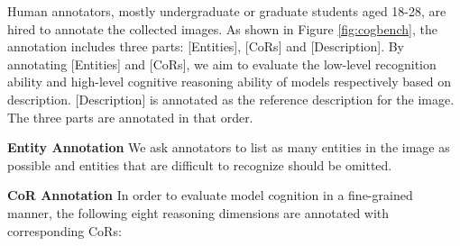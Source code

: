 Human annotators, mostly undergraduate or graduate students aged 18-28, are hired to annotate the collected images.
As shown in Figure \ref{fig:cogbench}, the annotation includes three parts: [Entities], [CoRs] and [Description].
By annotating [Entities] and [CoRs], we aim to evaluate the low-level recognition ability and high-level cognitive reasoning ability of models respectively based on description. 
[Description] is annotated as the reference description for the image.
The three parts are annotated in that order. 

\noindent\textbf{Entity Annotation} We ask annotators to list as many entities in the image as possible and entities
that are difficult to recognize should be omitted. 

\noindent\textbf{CoR Annotation} %
In order to evaluate model cognition in a fine-grained manner, the following eight reasoning dimensions are annotated with corresponding CoRs:


